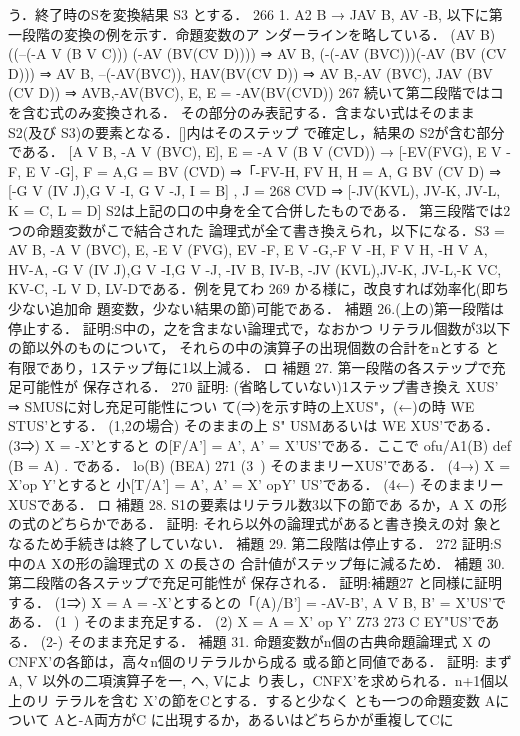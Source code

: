 \documentclass{ltjsarticle}
\theoremstyle{mystyle1}
\theoremstyle{mystyle3}
\theoremstyle{mystyle2}
\begin{document}
う．終了時のSを変換結果 S3 とする．
266
1. A2 B → JAV B, AV -B,
以下に第一段階の変換の例を示す．命題変数のア ンダーラインを略している．
(AV B)((--(-A V (B V C)))  (-AV
(BV(CV D)))) ⇒ AV B, (-(-AV (BVC)))(-AV (BV
(CV D))) ⇒ AV B, --(-AV(BVC)), HAV(BV(CV D)) ⇒ AV B,-AV (BVC), JAV (BV (CV D)) ⇒ AVB,-AV(BVC), E, E = -AV(BV(CVD))
267
続いて第二段階ではコを含む式のみ変換される． その部分のみ表記する．含まない式はそのまま S2(及び S3)の要素となる．[]内はそのステップ で確定し，結果の S2が含む部分である．
[A V B, -A V (BVC), E],
E = -A V (B V (CVD)) → [-EV(FVG), E V -F, E V -G],
F = A,G = BV (CVD) ⇒「-FV-H, FV H, H = A, G BV (CV D) ⇒ [-G V (IV J),G V -I, G V -J, I = B] , J =
268
CVD ⇒ [-JV(KVL), JV-K, JV-L, K = C, L = D]
S2は上記の口の中身を全て合併したものである． 第三段階では2つの命題変数がこで結合された 論理式が全て書き換えられ，以下になる．S3 = {AV B, -A V (BVC), E, -E V (FVG), EV -F, E V -G,-F V -H, F V H, -H V A, HV-A, -G V (IV J),G V -I,G V -J, -IV B, IV-B, -JV (KVL),JV-K, JV-L,-K VC, KV-C, -L V D, LV-D}である．例を見てわ
269
かる様に，改良すれば効率化(即ち少ない追加命 題変数，少ない結果の節)可能である．
補題 26.(上の)第一段階は停止する．
証明:S中の，之を含まない論理式で，なおかつ リテラル個数が3以下の節以外のものについて， それらの中の演算子の出現個数の合計をnとする と有限であり，1ステップ毎に1以上減る． ロ
補題 27. 第一段階の各ステップで充足可能性が 保存される．
270
証明: (省略していない)1ステップ書き換え {X}US' ⇒ SMUSに対し充足可能性につい て(⇒)を示す時の上{X}US"，(←)の時 WE STUS'とする． (1,2の場合) そのままの上 S" USMあるいは WE {X}US'である． (3⇒) X = -X'とすると の[F/A'] = { A', A' = X'}US'である．ここで ofu/A1(B) def  (B = A) .
である． lo(B) (BEA)
271
(3~) そのままリー{X}US'である． (4→) X = X'op Y'とすると 小[T/A'] = {A', A' = X' opY'} US'である． (4←) そのままリー {X}USである． ロ 補題 28. S1の要素はリテラル数3以下の節であ るか，A X の形の式のどちらかである．
証明: それら以外の論理式があると書き換えの対 象となるため手続きは終了していない．
補題 29. 第二段階は停止する．
272
証明:S中のA Xの形の論理式の X の長さの 合計値がステップ毎に減るため．
補題 30. 第二段階の各ステップで充足可能性が 保存される．
証明:補題27 と同様に証明する． (1⇒) X = A = -X'とするとの「(A)/B'] = {-AV-B', A V B, B' = X'}US'である． (1~) そのまま充足する． (2) X = A = X' op Y' Z73%
273
C EY"US'である． (2-) そのまま充足する．
補題 31. 命題変数がn個の古典命題論理式 X の CNFX'の各節は，高々n個のリテラルから成る 或る節と同値である．
証明: まずA, V 以外の二項演算子を一, へ, Vによ り表し，CNFX'を求められる．n+1個以上のリ テラルを含む X'の節をCとする．すると少なく とも一つの命題変数 Aについて Aと-A両方がC に出現するか，あるいはどちらかが重複してCに
\end{document}
